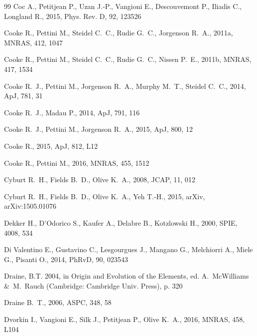 \documentclass[12pt,preprint,useAMS,usenatbib]{emulateapj}
\begin{document}
\begin{thebibliography}{99}
Coc A., Petitjean P., Uzan J.-P., Vangioni E., Descouvemont P., Iliadis C., Longland R., 2015, Phys. Rev. D, 92, 123526

Cooke R., Pettini M., Steidel C.~C., Rudie G.~C., Jorgenson R.~A., 2011a, MNRAS, 412, 1047

Cooke R., Pettini M., Steidel C.~C., Rudie G.~C., Nissen P.~E., 2011b, MNRAS, 417, 1534

Cooke R.~J., Pettini M., Jorgenson R.~A., Murphy M.~T., Steidel C.~C., 2014, ApJ, 781, 31

Cooke R.~J., Madau P., 2014, ApJ, 791, 116

Cooke R.~J., Pettini M., Jorgenson R.~A., 2015, ApJ, 800, 12

Cooke R., 2015, ApJ, 812, L12

Cooke R., Pettini M., 2016, MNRAS, 455, 1512

Cyburt R.~H., Fields B.~D., Olive K.~A., 2008, JCAP, 11, 012

Cyburt R.~H., Fields B.~D., Olive K.~A., Yeh T.-H., 2015, arXiv, arXiv:1505.01076

Dekker H., D'Odorico S., Kaufer A., Delabre B., Kotzlowski H., 2000, SPIE, 4008, 534

Di Valentino E., Gustavino C., Lesgourgues J., Mangano G., Melchiorri A., Miele G., Pisanti O., 2014, PhRvD, 90, 023543

Draine, B.T. 2004, in Origin and Evolution of the Elements, ed. A.~McWilliams \&\ M.~Rauch (Cambridge: Cambridge Univ. Press), p. 320

Draine B.~T., 2006, ASPC, 348, 58

Dvorkin I., Vangioni E., Silk J., Petitjean P., Olive K.~A., 2016, MNRAS, 458, L104


\end{thebibliography}
\end{document}
